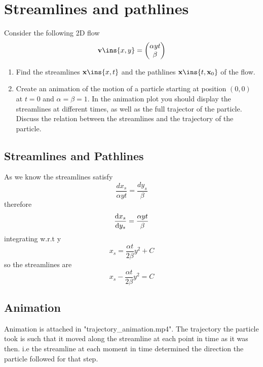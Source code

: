 \clearpage
\section{Streamlines and pathlines}
\begin{colbox}
	Consider the following 2D flow \begin{equation}
		\vb{v}\ins{x,y} = \mqty(\alpha yt \\ \beta)
	\end{equation}
	\begin{enumerate}
		\item Find the streamlines \(\vb{x}\ins{x,t}\) and the pathlines \(\vb{x}\ins{t,\vb{x}_0}\) of the flow.
		\item Create an animation of the motion of a particle starting at position \((0,0)\) at \(t=0\) and \(\alpha=\beta=1\). In the animation plot you should display the streamlines at different times, as well as the full trajector of the particle. Discuss the relation between the streamlines and the trajectory of the particle.
	\end{enumerate}
\end{colbox}
\subsection{Streamlines and Pathlines}
As we know the streamlines satisfy
\begin{equation}
	\frac{dx_s}{\alpha yt} = \frac{dy_s}{\beta}
\end{equation}
therefore
\begin{equation}
	\dv{x_s}{y_s} = \frac{\alpha yt}{\beta}
\end{equation}
integrating w.r.t y
\begin{equation}
	x_s = \frac{\alpha t}{2\beta}y^2+C
\end{equation}
so the streamlines are
\begin{equation}
	x_s - \frac{\alpha t}{2\beta}y^2=C
\end{equation}
\subsection{Animation}
Animation is attached in "trajectory\_animation.mp4". The trajectory the particle took is such that it moved along the streamline at each point in time as it was then. i.e the streamline at each moment in time determined the direction the particle followed for that step.